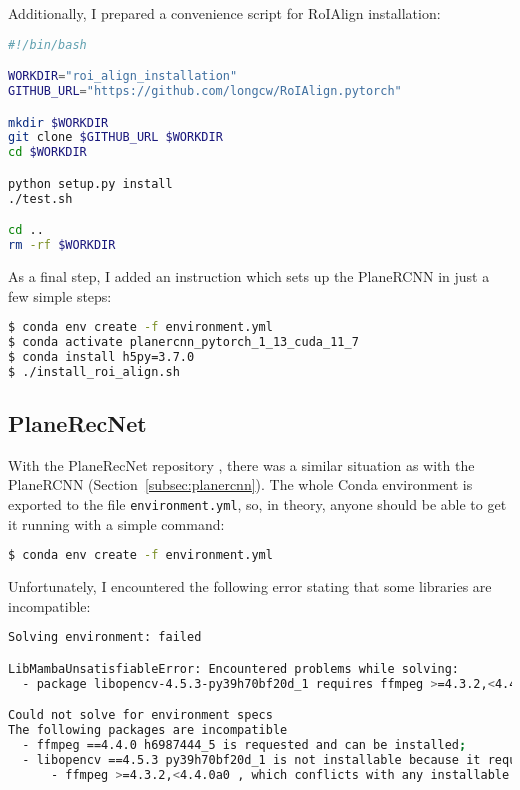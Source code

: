 Additionally, I prepared a convenience script for RoIAlign installation:
\begin{lstlisting}[language=bash]
#!/bin/bash

WORKDIR="roi_align_installation"
GITHUB_URL="https://github.com/longcw/RoIAlign.pytorch"

mkdir $WORKDIR
git clone $GITHUB_URL $WORKDIR
cd $WORKDIR

python setup.py install
./test.sh

cd ..
rm -rf $WORKDIR
\end{lstlisting}

As a final step, I added an instruction which sets up the PlaneRCNN in just a few simple steps:
\begin{lstlisting}[language=bash]
$ conda env create -f environment.yml
$ conda activate planercnn_pytorch_1_13_cuda_11_7
$ conda install h5py=3.7.0
$ ./install_roi_align.sh
\end{lstlisting}

\subsection{PlaneRecNet}

With the PlaneRecNet repository \cite{planerecnet-repository},
there was a similar situation as with the PlaneRCNN (Section~\ref{subsec:planercnn}).
The whole Conda environment is exported to the file \texttt{environment.yml}, so, in theory,
anyone should be able to get it running with a simple command:
\begin{lstlisting}[language=bash]
$ conda env create -f environment.yml
\end{lstlisting}

Unfortunately, I encountered the following error stating that some libraries are incompatible:
\begin{lstlisting}[language=bash]
Solving environment: failed

LibMambaUnsatisfiableError: Encountered problems while solving:
  - package libopencv-4.5.3-py39h70bf20d_1 requires ffmpeg >=4.3.2,<4.4.0a0, but none of the providers can be installed

Could not solve for environment specs
The following packages are incompatible
  - ffmpeg ==4.4.0 h6987444_5 is requested and can be installed;
  - libopencv ==4.5.3 py39h70bf20d_1 is not installable because it requires
      - ffmpeg >=4.3.2,<4.4.0a0 , which conflicts with any installable versions previously reported.
\end{lstlisting}

